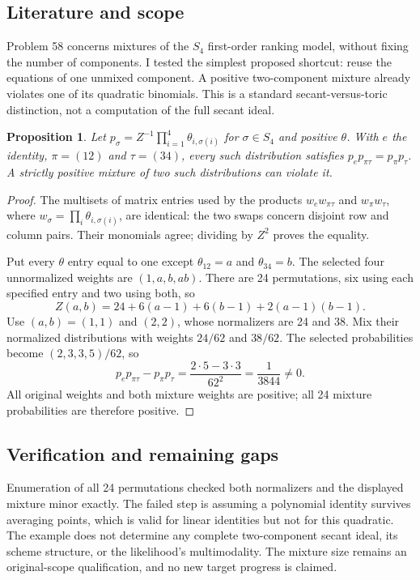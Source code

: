 \documentclass[11pt]{article}
\newtheorem{proposition}{Proposition}
\begin{document}
\subsection{Literature and scope}
Problem 58 concerns mixtures of the $S_4$ first-order ranking model, without fixing the number of components. I tested the simplest proposed shortcut: reuse the equations of one unmixed component. A positive two-component mixture already violates one of its quadratic binomials. This is a standard secant-versus-toric distinction, not a computation of the full secant ideal.
\begin{proposition}
Let $p_\sigma=Z^{-1}\prod_{i=1}^4\theta_{i,\sigma(i)}$ for $\sigma\in S_4$ and positive $\theta$. With $e$ the identity, $\pi=(12)$ and $\tau=(34)$, every such distribution satisfies $p_ep_{\pi\tau}=p_\pi p_\tau$. A strictly positive mixture of two such distributions can violate it.
\end{proposition}
\begin{proof}
The multisets of matrix entries used by the products $w_ew_{\pi\tau}$ and $w_\pi w_\tau$, where $w_\sigma=\prod_i\theta_{i,\sigma(i)}$, are identical: the two swaps concern disjoint row and column pairs. Their monomials agree; dividing by $Z^2$ proves the equality.

Put every $\theta$ entry equal to one except $\theta_{12}=a$ and $\theta_{34}=b$. The selected four unnormalized weights are $(1,a,b,ab)$. There are 24 permutations, six using each specified entry and two using both, so
\[
Z(a,b)=24+6(a-1)+6(b-1)+2(a-1)(b-1).
\]
Use $(a,b)=(1,1)$ and $(2,2)$, whose normalizers are 24 and 38. Mix their normalized distributions with weights $24/62$ and $38/62$. The selected probabilities become $(2,3,3,5)/62$, so
\[
p_ep_{\pi\tau}-p_\pi p_\tau=\frac{2\cdot5-3\cdot3}{62^2}=\frac1{3844}\ne0.
\]
All original weights and both mixture weights are positive; all 24 mixture probabilities are therefore positive.
\end{proof}
\subsection{Verification and remaining gaps}
Enumeration of all 24 permutations checked both normalizers and the displayed mixture minor exactly. The failed step is assuming a polynomial identity survives averaging points, which is valid for linear identities but not for this quadratic. The example does not determine any complete two-component secant ideal, its scheme structure, or the likelihood's multimodality. The mixture size remains an original-scope qualification, and no new target progress is claimed.
\end{document}
